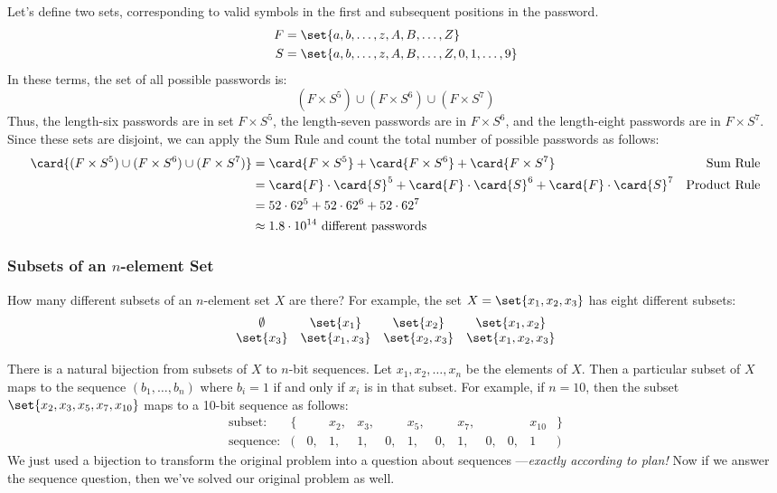 Let's define two sets, corresponding to valid symbols in the first and
subsequent positions in the password.
%
\begin{align*}
F & = \set{ a, b, \ldots, z, A, B, \ldots, Z } \\
S & = \set{ a, b, \ldots, z, A, B, \ldots, Z, 0, 1, \ldots, 9 }
\end{align*}
%
In these terms, the set of all possible passwords is:
%
\[
(F \times S^5) \cup (F \times S^6) \cup (F \times S^7)
\]
%
Thus, the length-six passwords are in set $F \times S^5$, the
length-seven passwords are in $F \times S^6$, and the length-eight
passwords are in $F \times S^7$.  Since these sets are disjoint, we
can apply the Sum Rule and count the total number of possible
passwords as follows:
%
\begin{align*}
\card{(F \times S^5) \cup (F \times S^6) \cup (F \times S^7)}
    & = \card{F \times S^5} + \card{F \times S^6} + \card{F \times S^7}
        & \text{Sum Rule} \\
    & = \card{F} \cdot \card{S}^5 +
          \card{F} \cdot \card{S}^6 +
          \card{F} \cdot \card{S}^7
        & \text{Product Rule} \\
    & = 52 \cdot 62^5 + 52 \cdot 62^6 + 52 \cdot 62^7 \\
    & \approx 1.8 \cdot 10^{14} \text{ different passwords}
\end{align*}

\subsubsection*{Subsets of an $n$-element Set}

How many different subsets of an $n$-element set $X$ are there?  For
example, the set $X = \set{x_1, x_2, x_3}$ has eight different subsets:
%
\[
\begin{array}{cccc}
\emptyset & \set{x_1} & \set{x_2} & \set{x_1, x_2} \\
\set{x_3} & \set{x_1, x_3} & \set{x_2, x_3} & \set{x_1, x_2, x_3}
\end{array}
\]

There is a natural bijection from subsets of $X$ to $n$-bit sequences.
Let $x_1, x_2, \ldots, x_n$ be the elements of $X$.  Then a particular
subset of $X$ maps to the sequence $(b_1, \ldots, b_n)$ where $b_i =
1$ if and only if $x_i$ is in that subset.  For example, if $n = 10$,
then the subset $\set{x_2, x_3, x_5, x_7, x_{10}}$ maps to a 10-bit
sequence as follows:
%
\[
\begin{array}{rrrrrrrrrrrrr}
\text{subset:} &
\{ &    & x_2, & x_3, &    & x_5, &   & x_7, &    &    & x_{10} & \} \\
\text{sequence:} &
(  & 0, &   1, &   1, & 0, &   1, & 0, &   1, & 0, & 0, &        1 & )
\end{array}
\]
%
We just used a bijection to transform the original problem into a
question about sequences ---\emph{exactly according to plan!}  Now
if we answer the sequence question, then we've solved our original
problem as well.

